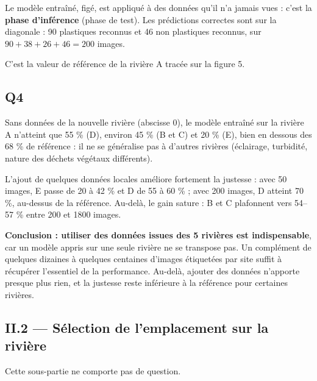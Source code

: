 \documentclass[11pt,a4paper]{article}
\newcommand{\equationajustee}[1]{%
  \sbox{\boiteequation}{$\displaystyle #1$}%
  \ifdim\wd\boiteequation>\linewidth
    \[\resizebox{\linewidth}{!}{\usebox{\boiteequation}}\]%
  \else
    \[#1\]%
  \fi}
\begin{document}
Le modèle entraîné, figé, est appliqué à des données qu'il n'a jamais vues : c'est la \textbf{phase d'inférence} (phase de test). Les prédictions correctes sont sur la diagonale : 90 plastiques reconnus et 46 non plastiques reconnus, sur \(90+38+26+46=200\) images.

\equationajustee{\begin{aligned}
\text{justesse}&=\frac{90+46}{200}\\
&=\frac{136}{200}
\end{aligned}}

\equationajustee{\boxed{\text{justesse}=68\ \%}}

C'est la valeur de référence de la rivière A tracée sur la figure 5.

\hypertarget{q4}{%
\subsection{Q4}\label{q4}}

Sans données de la nouvelle rivière (abscisse 0), le modèle entraîné sur la rivière A n'atteint que 55 \% (D), environ 45 \% (B et C) et 20 \% (E), bien en dessous des 68 \% de référence : il ne se généralise pas à d'autres rivières (éclairage, turbidité, nature des déchets végétaux différents).

L'ajout de quelques données locales améliore fortement la justesse : avec 50 images, E passe de 20 à 42 \% et D de 55 à 60 \% ; avec 200 images, D atteint 70 \%, au-dessus de la référence. Au-delà, le gain sature : B et C plafonnent vers 54--57 \% entre 200 et 1800 images.

\textbf{Conclusion : utiliser des données issues des 5 rivières est indispensable}, car un modèle appris sur une seule rivière ne se transpose pas. Un complément de quelques dizaines à quelques centaines d'images étiquetées par site suffit à récupérer l'essentiel de la performance. Au-delà, ajouter des données n'apporte presque plus rien, et la justesse reste inférieure à la référence pour certaines rivières.

\hypertarget{ii.2-suxe9lection-de-lemplacement-sur-la-riviuxe8re}{%
\subsection{II.2 --- Sélection de l'emplacement sur la rivière}\label{ii.2-suxe9lection-de-lemplacement-sur-la-riviuxe8re}}

Cette sous-partie ne comporte pas de question.
\end{document}
